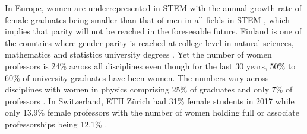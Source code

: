 \documentclass[utf8]{frontiersSCNS} %
\begin{document}


In Europe, women are underrepresented in STEM with the annual growth rate of female graduates being smaller than that of men in all fields in STEM \citep{She2018}, which implies that parity will not be reached in the foreseeable future. Finland is one of the countries where gender parity is reached at college level in natural sciences, mathematics and statistics university degrees  \citep{FinlandStats}. Yet the number of women professors is 24\% across all disciplines even though for the last 30 years, 50\% to 60\% of university graduates have been women. The numbers vary across disciplines with women in physics comprising 25\% of graduates and only 7\% of professors \citep{banzuzi2013women}. In Switzerland, ETH Z{\"u}rich had 31\% female students in 2017 while only 13.9\% female professors with the number of women holding full or associate professorships being 12.1\% \citep{schubert2017gender}.
 
\end{document}
